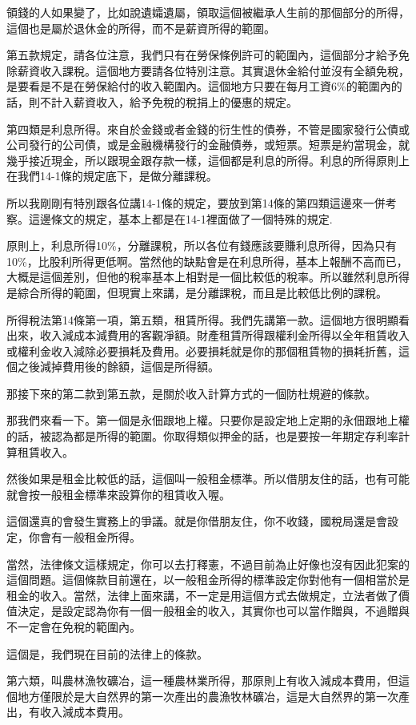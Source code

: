 \documentclass[oneside,sub3section]{ctexbook}
\begin{document}
領錢的人如果變了，比如說遺孀遺屬，領取這個被繼承人生前的那個部分的所得，這個也是屬於退休金的所得，而不是薪資所得的範圍。

第五款規定，請各位注意，我們只有在勞保條例許可的範圍內，這個部分才給予免除薪資收入課稅。這個地方要請各位特別注意。其實退休金給付並沒有全額免稅，是要看是不是在勞保給付的收入範圍內。這個地方只要在每月工資6\%的範圍內的話，則不計入薪資收入，給予免稅的稅捐上的優惠的規定。

第四類是利息所得。來自於金錢或者金錢的衍生性的債券，不管是國家發行公債或公司發行的公司債，或是金融機構發行的金融債券，或短票。短票是約當現金，就幾乎接近現金，所以跟現金跟存款一樣，這個都是利息的所得。利息的所得原則上在我們14-1條的規定底下，是做分離課稅。

所以我剛剛有特別跟各位講14-1條的規定，要放到第14條的第四類這邊來一併考察。這邊條文的規定，基本上都是在14-1裡面做了一個特殊的規定.

原則上，利息所得10\%，分離課稅，所以各位有錢應該要賺利息所得，因為只有10\%，比股利所得更低啊。當然他的缺點會是在利息所得，基本上報酬不高而已，大概是這個差別，但他的稅率基本上相對是一個比較低的稅率。所以雖然利息所得是綜合所得的範圍，但現實上來講，是分離課稅，而且是比較低比例的課稅。

所得稅法第14條第一項，第五類，租賃所得。我們先講第一款。這個地方很明顯看出來，收入減成本減費用的客觀凈額。財產租賃所得跟權利金所得以全年租賃收入或權利金收入減除必要損耗及費用。必要損耗就是你的那個租賃物的損耗折舊，這個之後減掉費用後的餘額，這個是所得額。

那接下來的第二款到第五款，是關於收入計算方式的一個防杜規避的條款。

那我們來看一下。第一個是永佃跟地上權。只要你是設定地上定期的永佃跟地上權的話，被認為都是所得的範圍。你取得類似押金的話，也是要按一年期定存利率計算租賃收入。

然後如果是租金比較低的話，這個叫一般租金標準。所以借朋友住的話，也有可能就會按一般租金標準來設算你的租賃收入喔。

這個還真的會發生實務上的爭議。就是你借朋友住，你不收錢，國稅局還是會設定，你會有一般租金所得。

當然，法律條文這樣規定，你可以去打釋憲，不過目前為止好像也沒有因此犯案的這個問題。這個條款目前還在，以一般租金所得的標準設定你對他有一個相當於是租金的收入。當然，法律上面來講，不一定是用這個方式去做規定，立法者做了價值決定，是設定認為你有一個一般租金的收入，其實你也可以當作贈與，不過贈與不一定會在免稅的範圍內。

這個是，我們現在目前的法律上的條款。

第六類，叫農林漁牧礦冶，這一種農林業所得，那原則上有收入減成本費用，但這個地方僅限於是大自然界的第一次產出的農漁牧林礦冶，這是大自然界的第一次產出，有收入減成本費用。
\end{document}
